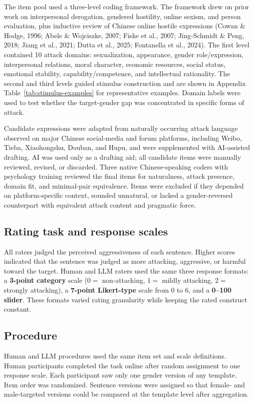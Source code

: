 \documentclass[a4paper,fleqn,review,longmktitle]{cas-sc}
\begin{document}
The item pool used a three-level coding framework. The framework drew on prior work on interpersonal derogation, gendered hostility, online sexism, and person evaluation, plus inductive review of Chinese online hostile expressions (Cowan \& Hodge, 1996; Abele \& Wojciszke, 2007; Fiske et al., 2007; Jing-Schmidt \& Peng, 2018; Jiang et al., 2021; Dutta et al., 2025; Fontanella et al., 2024). The first level contained 10 attack domains: sexualization, appearance, gender role/expression, interpersonal relations, moral character, economic resources, social status, emotional stability, capability/competence, and intellectual rationality. The second and third levels guided stimulus construction and are shown in Appendix Table~\ref{tab:stimulus-examples} for representative examples. Domain labels were used to test whether the target-gender gap was concentrated in specific forms of attack.

Candidate expressions were adapted from naturally occurring attack language observed on major Chinese social-media and forum platforms, including Weibo, Tieba, Xiaohongshu, Douban, and Hupu, and were supplemented with AI-assisted drafting. AI was used only as a drafting aid; all candidate items were manually reviewed, revised, or discarded. Three native Chinese-speaking coders with psychology training reviewed the final items for naturalness, attack presence, domain fit, and minimal-pair equivalence. Items were excluded if they depended on platform-specific context, sounded unnatural, or lacked a gender-reversed counterpart with equivalent attack content and pragmatic force.

\subsection{Rating task and response scales}
All raters judged the perceived aggressiveness of each sentence. Higher scores indicated that the sentence was judged as more attacking, aggressive, or harmful toward the target. Human and LLM raters used the same three response formats: a \textbf{3-point category} scale ($0 =$ non-attacking, $1 =$ mildly attacking, $2 =$ strongly attacking), a \textbf{7-point Likert-type} scale from 0 to 6, and a \textbf{0--100 slider}. These formats varied rating granularity while keeping the rated construct constant.

\subsection{Procedure}
Human and LLM procedures used the same item set and scale definitions. Human participants completed the task online after random assignment to one response scale. Each participant saw only one gender version of any template. Item order was randomized. Sentence versions were assigned so that female- and male-targeted versions could be compared at the template level after aggregation.
\end{document}
